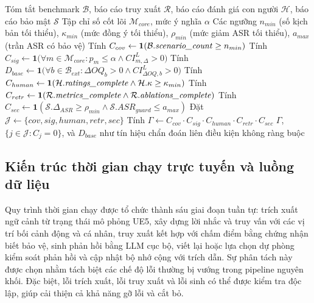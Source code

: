 ﻿\documentclass[a4paper,12pt]{article}
\newcommand{\ind}{\mathbf{1}}
\newcommand{\codeid}[1]{\textit{#1}}
\begin{document}
\begin{algorithm}[H]
\caption{Đánh giá cổng tính đầy đủ bằng chứng}
\begin{algorithmic}[1]
\Require Tóm tắt benchmark \(\mathcal{B}\), báo cáo truy xuất \(\mathcal{R}\), báo cáo đánh giá con người \(\mathcal{H}\), báo cáo bảo mật \(\mathcal{S}\)
\Require Tập chỉ số cốt lõi \(\mathcal{M}_{core}\), mức ý nghĩa \(\alpha\)
\Require Các ngưỡng \(n_{min}\) (số kịch bản tối thiểu), \(\kappa_{min}\) (mức đồng ý tối thiểu), \(\rho_{min}\) (mức giảm ASR tối thiểu), \(a_{max}\) (trần ASR có bảo vệ)
\State Tính \(C_{cov}\gets \ind(\mathcal{B}.\text{\codeid{scenario\_count}}\ge n_{min})\)
\State Tính \(C_{sig}\gets \ind\!\Big(\forall m\in\mathcal{M}_{core}: p_m\le\alpha \land CI_{m,\Delta}^{L}>0\Big)\)
\State Tính \(D_{base}\gets \ind\!\Big(\forall b\in\mathcal{B}_{ext}: \Delta OQ_b>0 \land CI^{L}_{\Delta OQ,b}>0\Big)\) 
\State Tính \(C_{human}\gets \ind(\mathcal{H}.\text{\codeid{ratings\_complete}} \land \mathcal{H}.\kappa\ge\kappa_{min})\)
\State Tính \(C_{retr}\gets \ind(\mathcal{R}.\text{\codeid{metrics\_complete}} \land \mathcal{R}.\text{\codeid{ablations\_complete}})\)
\State Tính \(C_{sec}\gets \ind(\mathcal{S}.\Delta_{ASR}\ge\rho_{min} \land \mathcal{S}.ASR_{guard}\le a_{max})\)
\State Đặt \(\mathcal{J}\gets\{cov,sig,human,retr,sec\}\)
\State Tính \(\Gamma \gets C_{cov}\cdot C_{sig}\cdot C_{human}\cdot C_{retr}\cdot C_{sec}\)
\State \Return \(\Gamma\), \(\{j\in\mathcal{J}: C_j=0\}\), và \(D_{base}\) như tín hiệu chẩn đoán liên điều kiện không ràng buộc
\end{algorithmic}
\end{algorithm}

\subsection{Kiến trúc thời gian chạy trực tuyến và luồng dữ liệu}

Quy trình thời gian chạy được tổ chức thành sáu giai đoạn tuần tự: trích xuất ngữ cảnh từ trạng thái mô phỏng UE5, xây dựng lời nhắc và truy vấn với các vị trí bối cảnh động và cá nhân, truy xuất kết hợp với chấm điểm bằng chứng nhận biết bảo vệ, sinh phản hồi bằng LLM cục bộ, viết lại hoặc lựa chọn dự phòng kiểm soát phản hồi và cập nhật bộ nhớ cộng với trích dẫn. Sự phân tách này được chọn nhằm tách biệt các chế độ lỗi thường bị vướng trong pipeline nguyên khối. Đặc biệt, lỗi trích xuất, lỗi truy xuất và lỗi sinh có thể được kiểm tra độc lập, giúp cải thiện cả khả năng gỡ lỗi và cắt bỏ.
\end{document}
